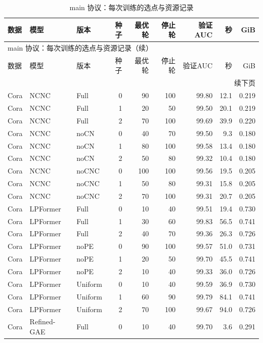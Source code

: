 {\footnotesize
\setlength{\tabcolsep}{3.2pt}
\renewcommand{\arraystretch}{1.10}
\begin{longtable}{lllrrrrrr}
\caption{main 协议：每次训练的选点与资源记录}\\
\toprule
数据 & 模型 & 版本 & 种子 & 最优轮 & 停止轮 & 验证AUC & 秒 & GiB \\
\midrule
\endfirsthead
\multicolumn{9}{l}{main 协议：每次训练的选点与资源记录（续）}\\
\toprule
数据 & 模型 & 版本 & 种子 & 最优轮 & 停止轮 & 验证AUC & 秒 & GiB \\
\midrule
\endhead
\midrule\multicolumn{9}{r}{续下页}\\
\endfoot
\bottomrule
\endlastfoot
Cora & NCNC & Full & 0 & 90 & 100 & 99.80 & 12.1 & 0.219 \\
Cora & NCNC & Full & 1 & 20 & 50 & 99.50 & 20.1 & 0.219 \\
Cora & NCNC & Full & 2 & 70 & 100 & 99.69 & 39.9 & 0.220 \\
Cora & NCNC & noCN & 0 & 40 & 70 & 99.50 & 9.3 & 0.180 \\
Cora & NCNC & noCN & 1 & 80 & 100 & 99.58 & 13.4 & 0.180 \\
Cora & NCNC & noCN & 2 & 50 & 80 & 99.32 & 10.4 & 0.180 \\
Cora & NCNC & noCNC & 0 & 100 & 100 & 99.56 & 19.5 & 0.205 \\
Cora & NCNC & noCNC & 1 & 50 & 80 & 99.31 & 15.8 & 0.205 \\
Cora & NCNC & noCNC & 2 & 70 & 100 & 99.31 & 20.7 & 0.205 \\
Cora & LPFormer & Full & 0 & 10 & 40 & 99.51 & 19.4 & 0.730 \\
Cora & LPFormer & Full & 1 & 30 & 60 & 99.83 & 56.5 & 0.741 \\
Cora & LPFormer & Full & 2 & 40 & 70 & 99.36 & 26.3 & 0.726 \\
Cora & LPFormer & noPE & 0 & 90 & 100 & 99.57 & 51.0 & 0.731 \\
Cora & LPFormer & noPE & 1 & 20 & 50 & 99.70 & 45.5 & 0.741 \\
Cora & LPFormer & noPE & 2 & 10 & 40 & 99.33 & 36.0 & 0.726 \\
Cora & LPFormer & Uniform & 0 & 10 & 40 & 99.59 & 36.9 & 0.730 \\
Cora & LPFormer & Uniform & 1 & 60 & 90 & 99.79 & 84.1 & 0.741 \\
Cora & LPFormer & Uniform & 2 & 70 & 100 & 99.67 & 94.0 & 0.726 \\
Cora & Refined-GAE & Full & 0 & 10 & 40 & 99.70 & 3.6 & 0.291 \\

\end{longtable}}

